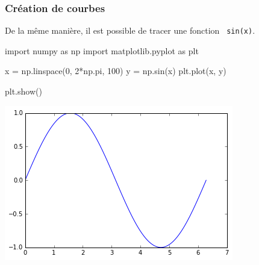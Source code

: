 \begin{frame}[fragile]
\frametitle{Création de courbes}

De la même manière, il est possible de tracer une fonction \verb? sin(x)?.

\begin{minipage}{0.5\linewidth}
\begin{GrayBox}[0.85\textwidth]
\begin{verbatimtab}[3]
import numpy as np
import matplotlib.pyplot as plt

x = np.linspace(0, 2*np.pi, 100)
y = np.sin(x)
plt.plot(x, y)

plt.show()
\end{verbatimtab}
\end{GrayBox}
\end{minipage}\hfill
\begin{minipage}{0.46\linewidth}
\begin{center}
 \includegraphics[width=0.9\linewidth]{img/courbe1}
\end{center}
\end{minipage}

\end{frame}


